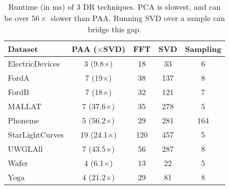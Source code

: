 \begin{table}[]
\centering
\caption{Runtime (in ms) of 3 DR techniques. PCA is slowest, and can be over $56\times$ slower than PAA. Running SVD over a sample can bridge this gap.}
\label{tab:runtime-comparison}
\scriptsize
\begin{tabular}{|l|c|c|c|c|}
\hline
\textbf{Dataset}        & \textbf{PAA ($\times$SVD)} & \textbf{FFT} & \textbf{SVD} & \textbf{Sampling} \\ \hline
ElectricDevices         & 3 (9.8$\times$)            & 18           & 33           & 6                 \\ \hline
FordA                   & 7 (19$\times$)             & 38           & 137          & 8                 \\ \hline
FordB                   & 7 (18$\times$)             & 32           & 121          & 7                 \\ \hline
MALLAT                  & 7 (37.6$\times$)           & 35           & 278          & 5                 \\ \hline
Phoneme                 & 5 (56.2$\times$)           & 29           & 281          & 164               \\ \hline
StarLightCurves         & 19 (24.1$\times$)          & 120          & 457          & 5                 \\ \hline
UWGLAll & 7 (43.5$\times$)           & 56           & 287          & 8                 \\ \hline
Wafer                   & 4 (6.1$\times$)            & 13           & 22           & 5                 \\ \hline
Yoga                    & 4 (21.2$\times$)           & 29           & 81           & 8                 \\ \hline
\end{tabular}
\end{table}



